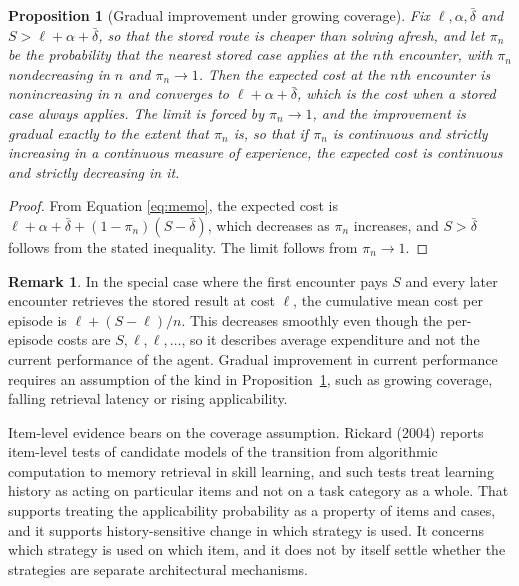 \documentclass[11pt]{article}
\newtheorem{proposition}{Proposition}
\theoremstyle{definition}
\newtheorem{remark}{Remark}
\begin{document}
\begin{proposition}[Gradual improvement under growing coverage]\label{prop:improve}
Fix $\ell,\alpha,\bar\delta$ and $S>\ell+\alpha+\bar\delta$, so that the stored route is cheaper than solving afresh, and let $\pi_n$ be the probability that the nearest stored case applies at the $n$th encounter, with $\pi_n$ nondecreasing in $n$ and $\pi_n\to1$. Then the expected cost at the $n$th encounter is nonincreasing in $n$ and converges to $\ell+\alpha+\bar\delta$, which is the cost when a stored case always applies. The limit is forced by $\pi_n\to1$, and the improvement is gradual exactly to the extent that $\pi_n$ is, so that if $\pi_n$ is continuous and strictly increasing in a continuous measure of experience, the expected cost is continuous and strictly decreasing in it.
\end{proposition}

\begin{proof}
From Equation \eqref{eq:memo}, the expected cost is $\ell+\alpha+\bar\delta+(1-\pi_n)(S-\bar\delta)$, which decreases as $\pi_n$ increases, and $S>\bar\delta$ follows from the stated inequality. The limit follows from $\pi_n\to1$.
\end{proof}

\begin{remark}
In the special case where the first encounter pays $S$ and every later encounter retrieves the stored result at cost $\ell$, the cumulative mean cost per episode is $\ell+(S-\ell)/n$. This decreases smoothly even though the per-episode costs are $S,\ell,\ell,\ldots$, so it describes average expenditure and not the current performance of the agent. Gradual improvement in current performance requires an assumption of the kind in Proposition~\ref{prop:improve}, such as growing coverage, falling retrieval latency or rising applicability.
\end{remark}

Item-level evidence bears on the coverage assumption. Rickard (2004) reports item-level tests of candidate models of the transition from algorithmic computation to memory retrieval in skill learning, and such tests treat learning history as acting on particular items and not on a task category as a whole. That supports treating the applicability probability as a property of items and cases, and it supports history-sensitive change in which strategy is used. It concerns which strategy is used on which item, and it does not by itself settle whether the strategies are separate architectural mechanisms.
\end{document}
